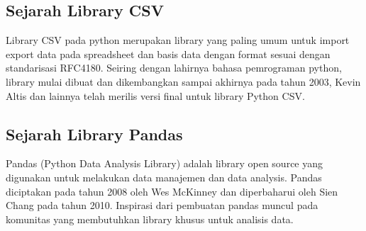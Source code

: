 \subsection{Sejarah Library CSV}
Library CSV pada python merupakan library yang paling umum untuk import export data pada spreadsheet dan basis data dengan format sesuai dengan standarisasi RFC4180. Seiring dengan lahirnya bahasa pemrograman python, library mulai dibuat dan dikembangkan sampai akhirnya pada tahun 2003, Kevin Altis dan lainnya telah merilis versi final untuk library Python CSV. 

\subsection{Sejarah Library Pandas}
Pandas (Python Data Analysis Library) adalah library open source yang digunakan untuk melakukan data manajemen dan data analysis. Pandas diciptakan pada tahun 2008 oleh Wes McKinney dan diperbaharui oleh Sien Chang pada tahun 2010. Inspirasi dari pembuatan pandas muncul pada komunitas yang membutuhkan library khusus untuk analisis data.

